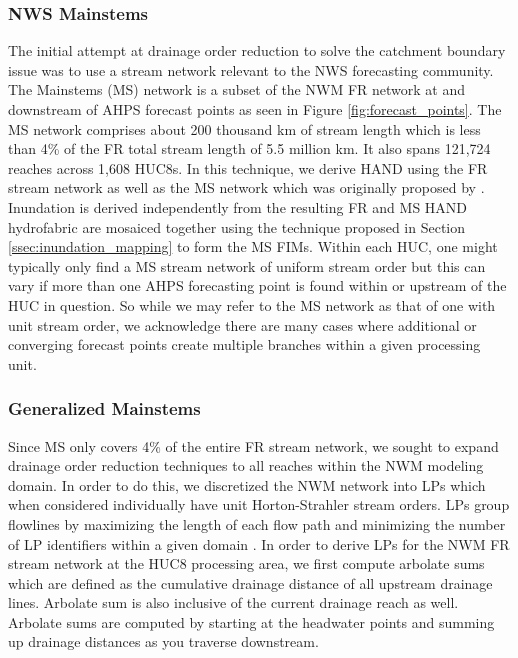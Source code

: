 \documentclass[draft]{dependencies/agujournal2019}
\begin{document}
\subsubsection{NWS Mainstems}
\label{sssec:nws_mainstems}
%
The initial attempt at drainage order reduction to solve the catchment boundary issue was to use a stream network relevant to the NWS forecasting community. 
The Mainstems (MS) network is a subset of the NWM FR network at and downstream of AHPS forecast points as seen in Figure \ref{fig:forecast_points}.
The MS network comprises about 200 thousand km of stream length which is less than 4\% of the FR total stream length of 5.5 million km.
It also spans 121,724 reaches across 1,608 HUC8s.
In this technique, we derive HAND using the FR stream network as well as the MS network which was originally proposed by .
Inundation is derived independently from the resulting FR and MS HAND hydrofabric are mosaiced together using the technique proposed in Section \ref{ssec:inundation_mapping} to form the MS FIMs. 
Within each HUC, one might typically only find a MS stream network of uniform stream order but this can vary if more than one AHPS forecasting point is found within or upstream of the HUC in question.
So while we may refer to the MS network as that of one with unit stream order, we acknowledge there are many cases where additional or converging forecast points create multiple branches within a given processing unit.
%
\subsubsection{Generalized Mainstems}
\label{sssec:generalized_mainstems}
%
Since MS only covers 4\% of the entire FR stream network, we sought to expand drainage order reduction techniques to all reaches within the NWM modeling domain.
In order to do this, we discretized the NWM network into LPs which when considered individually have unit Horton-Strahler stream orders.
LPs group flowlines by maximizing the length of each flow path and minimizing the number of LP identifiers within a given domain \cite{moore2019user,mckay2012nhdplus}. 
In order to derive LPs for the NWM FR stream network at the HUC8 processing area, we first compute arbolate sums which are defined as the cumulative drainage distance of all upstream drainage lines.
Arbolate sum is also inclusive of the current drainage reach as well.
Arbolate sums are computed by starting at the headwater points and summing up drainage distances as you traverse downstream.
\end{document}
